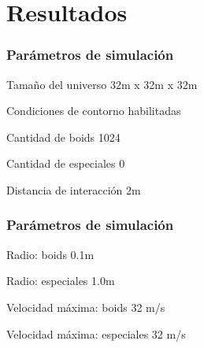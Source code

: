 \documentclass{beamer}
\begin{document}
    \section{Resultados}
        \begin{frame}
            \frametitle{Parámetros de simulación}
            \begin{block}{Tamaño del universo}
                32m x 32m x 32m
            \end{block}
            \begin{block}{Condiciones de contorno}
                habilitadas
            \end{block}
            \begin{block}{Cantidad de boids}
                1024
            \end{block}
            \begin{block}{Cantidad de especiales}
                0
            \end{block}
            \begin{block}{Distancia de interacción}
                2m
            \end{block}
        \end{frame}
        \begin{frame}
            \frametitle{Parámetros de simulación}
            \begin{block}{Radio: boids}
                0.1m
            \end{block}
            \begin{block}{Radio: especiales}
                1.0m
            \end{block}
            \begin{block}{Velocidad máxima: boids}
                32 m/s
            \end{block}
            \begin{block}{Velocidad máxima: especiales}
                32 m/s
            \end{block}
        \end{frame}
\end{document}
